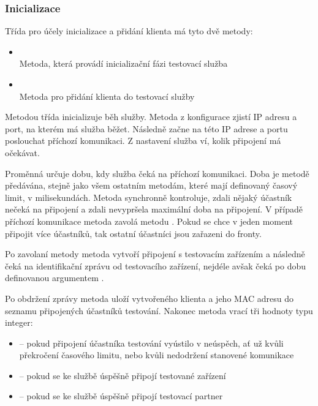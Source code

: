 \subsubsection{Inicializace}

Třída  pro účely inicializace a přidání klienta má tyto dvě metody:

\begin{itemize}
    \item {} \\
    Metoda, která provádí inicializační fázi testovací služba
    \item {}\\
    Metoda pro přidání klienta do testovací služby
\end{itemize}

Metodou  třída inicializuje běh služby. Metoda z konfigurace zjistí IP adresu a port, na kterém má služba běžet. Následně začne na této IP adrese a portu poslouchat příchozí komunikaci. Z nastavení služba ví, kolik připojení má očekávat. 

Proměnná  určuje dobu, kdy služba čeká na příchozí komunikaci. Doba je metodě předávána, stejně jako všem ostatním metodám, které mají definovaný časový limit, v milisekundách. Metoda synchronně kontroluje, zdali nějaký účastník nečeká na připojení a zdali nevypršela maximální doba na připojení. V případě příchozí komunikace metoda zavolá metodu . Pokud se chce v jeden moment připojit více účastníků, tak ostatní účastníci jsou zařazeni do fronty.

Po zavolaní metody  metoda vytvoří připojení s testovacím zařízením a následně čeká na identifikační zprávu od testovacího zařízení, nejdéle avšak čeká po dobu definovanou argumentem . 

Po obdržení zprávy metoda uloží vytvořeného klienta a jeho MAC adresu do seznamu připojených účastníků testování. Nakonec metoda vrací tři hodnoty typu integer:
\begin{itemize}
    \item {} -- pokud připojení účastníka testování vyústilo v neúspěch, ať už kvůli překročení časového limitu, nebo kvůli nedodržení stanovené komunikace
    \item {} -- pokud se ke službě úspěšně připojí testované zařízení
    \item {} -- pokud se ke službě úspěšně připojí testovací partner
\end{itemize}


